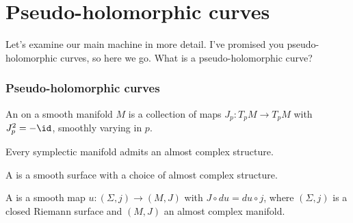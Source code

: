 \section{Pseudo-holomorphic curves}
Let's examine our main machine in more detail. I've promised you pseudo-holomorphic curves, so here we go. What is a pseudo-holomorphic curve?
\begin{frame}
  \frametitle{Pseudo-holomorphic curves}
\end{frame}

\begin{definition}
  An  on a smooth manifold $M$ is a collection of maps $J_p\colon T_pM\to T_pM$ with $J_p^2=-\id$, smoothly varying in $p$.
\end{definition}
\begin{theorem}
  Every symplectic manifold admits an almost complex structure.
\end{theorem}

\begin{definition}
  A  is a smooth surface with a choice of almost complex structure.
\end{definition}
\begin{definition}
  A  is a smooth map $u\colon (\Sigma,j)\to (M,J)$ with $J\circ du=du\circ j$,
where $(\Sigma,j)$ is a closed Riemann surface and $(M,J)$ an almost complex manifold.
\end{definition}


